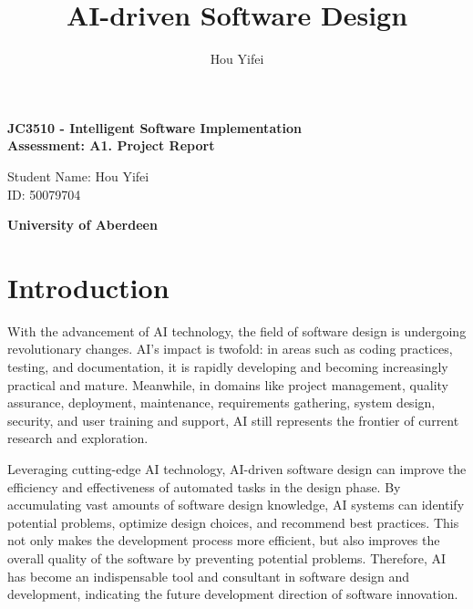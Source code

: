 \documentclass{article}
\title{AI-driven Software Design}
\author{Hou Yifei}
\begin{document}
\maketitle

\vspace{10em}
\begin{center}
\noindent
{\large \textbf{ JC3510 - Intelligent Software Implementation \\
Assessment: A1. Project Report}}    
\end{center}


\vspace{5em}

\begin{center}
\noindent
{\large Student Name: Hou Yifei \\
ID: 50079704\\}
\end{center}


\vfill
\begin{center}
\noindent
{\Large \textbf{University of Aberdeen}}    
\end{center}


\pagebreak

\section{Introduction}

With the advancement of AI technology, the field of software design is undergoing revolutionary changes. AI's impact is 
twofold: in areas such as coding practices, testing, and documentation, it is rapidly developing and becoming 
increasingly practical and mature. Meanwhile, in domains like project management, quality assurance, 
deployment, maintenance, requirements gathering, system design, security, and user training and support, 
AI still represents the frontier of current research and exploration.

Leveraging cutting-edge AI technology, AI-driven software design can improve the efficiency and effectiveness of automated tasks 
in the design phase. By accumulating vast amounts of software design knowledge, AI systems can identify potential problems, 
optimize design choices, and recommend best practices. This not only makes the development process more efficient, but also 
improves the overall quality of the software by preventing potential problems. Therefore, AI has become 
an indispensable tool and consultant in software design and development, indicating the future development direction of 
software innovation.
\end{document}
